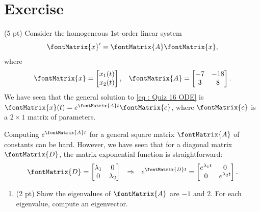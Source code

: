 %
%
\section{Exercise}

(5 pt) Consider the homogeneous 1st-order linear system
\begin{align}
\fontMatrix{x}'
=
\fontMatrix{A} \fontMatrix{x},%
\label{eq : Quiz 16 ODE}
\end{align}
where
\begin{align*}
\fontMatrix{x}
=
\begin{bmatrix}
x_{1}(t)	\\
x_{2}(t)
\end{bmatrix}%
,
&&
\fontMatrix{A}
=
\begin{bmatrix}
-7	&	-18	\\
3	&	8
\end{bmatrix}%
.
\end{align*}
We have seen that the general solution to \eqref{eq : Quiz 16 ODE} is $\fontMatrix{x}(t) = e^{\fontMatrix{A} t} \fontMatrix{c}$, where $\fontMatrix{c}$ is a $2 \times 1$ matrix of parameters.

Computing $e^{\fontMatrix{A} t}$ for a general square matrix $\fontMatrix{A}$ of constants can be hard. However, we have seen that for a diagonal matrix $\fontMatrix{D}$, the matrix exponential function is straightforward:
\begin{align}
\fontMatrix{D}
=
\begin{bmatrix}
\lambda_{1}	&	0			\\
0			&	\lambda_{2}
\end{bmatrix}
&&
\Rightarrow
&&
e^{\fontMatrix{D} t}
=
\begin{bmatrix}
e^{\lambda_{1} t}	&	0				\\
0				&	e^{\lambda_{2} t}
\end{bmatrix}%
.%
\label{eq : Quiz 16 Matrix Exponential Diagonal Matrix}
\end{align}
\begin{enumerate}[label=(\alph*)]
\item\label{itm : Quiz16 a} (2 pt) Show the eigenvalues of $\fontMatrix{A}$ are $-1$ and $2$. For each eigenvalue, compute an eigenvector.
\end{enumerate}

